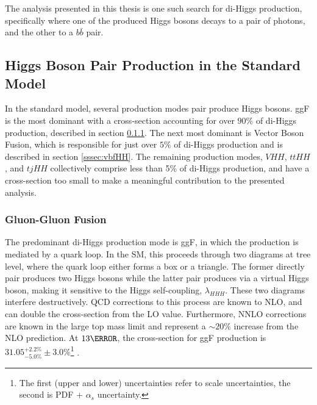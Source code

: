 The analysis presented in this thesis is one such search for di-Higgs production, specifically where one of the produced Higgs bosons decays to a pair of photons, and the other to a $b\bar{b}$ pair.

\subsection{Higgs Boson Pair Production in the Standard Model}
In the standard model, several production modes pair produce Higgs bosons. \gls{ggF} is the most dominant with a cross-section accounting for over $90\%$ of di-Higgs production, described in section \ref{sssec:ggfHH}. The next most dominant is Vector Boson Fusion, which is responsible for just over $5\%$ of di-Higgs production and is described in section \ref{sssec:vbfHH}. The remaining production modes, $VHH$, $ttHH$, and $tjHH$ collectively comprise less than 5\% of di-Higgs production, and have a cross-section too small to make a meaningful contribution to the presented analysis.

\subsubsection{Gluon-Gluon Fusion} \label{sssec:ggfHH}

The predominant di-Higgs production mode is \gls{ggF}, in which the production is mediated by a quark loop. In the \gls{SM}, this proceeds through two diagrams at tree level, where the quark loop either forms a box or a triangle. The former directly pair produces two Higgs bosons while the latter pair produces via a virtual Higgs boson, making it sensitive to the Higgs self-coupling, $\lambda_{HHH}$. These two diagrams interfere destructively. QCD corrections to this process are known to \gls{NLO}, and can double the cross-section from the \gls{LO} value. Furthermore, \gls{NNLO} corrections are known in the large top mass limit and represent a $\sim 20\%$ increase from the \gls{NLO} prediction. At $\unit{13}{\TeV}$, the cross-section for \gls{ggF} production is $31.05^{+2.2\%}_{-5.0\%} \pm 3.0\%$\footnote{The first (upper and lower) uncertainties refer to scale uncertainties, the second is PDF + $\alpha_s$ uncertainty.}  \cite{hh-crosssections}.

